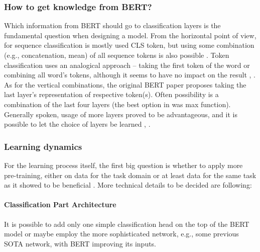 \subsubsection{How to get knowledge from BERT?}
Which information from BERT should go to classification layers is the fundamental question when designing a model. From the horizontal point of view, for sequence classification is mostly used CLS token, but using some combination (e.g., concatenation, mean) of all sequence tokens is also possible \citep{Rogers2020}. Token classification uses an analogical approach -- taking the first token of the word or combining all word's tokens, although it seems to have no impact on the result \citep{Kondratyuk2019}, \citep{Kitaev2018}. As for the vertical combinations, the original BERT paper proposes taking the last layer's representation of respective token(s). Often possibility is a combination of the last four layers (the best option in \citep{Sun} was max function). Generally spoken, usage of more layers proved to be advantageous, and it is possible to let the choice of layers be learned \citep{Yang2019b}, \citep{Kondratyuk2019}. %
\subsubsection{Learning dynamics}
For the learning process itself, the first big question is whether to apply more pre-training, either on data for the task domain or at least data for the same task as it showed to be beneficial \citep{Sun}. More technical details to be decided are following:

\paragraph{Classification Part Architecture} It is possible to add only one simple classification head on the top of the BERT model or maybe employ the more sophisticated network, e.g., some previous SOTA network, with BERT improving its inputs.
